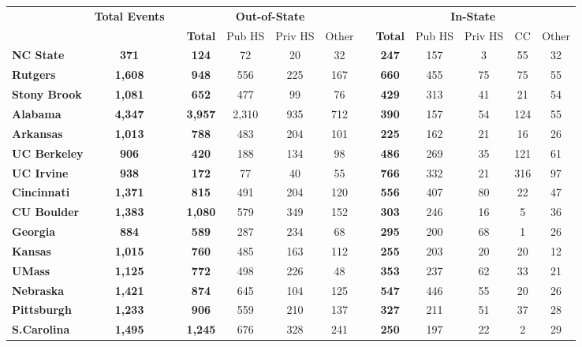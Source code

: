\begin{tabular*}{\textwidth}{@{\extracolsep{\fill} } lcccccccccccc}%
&\bfseries Total Events&&\multicolumn{4}{c}{\bfseries Out-of-State}&&\multicolumn{5}{c}{\bfseries In-State}\\%
&&&\bfseries Total&Pub HS&Priv HS&Other&&\bfseries Total&Pub HS&Priv HS&CC&Other\\%
\hline%
\bfseries NC State&\bfseries 371&&\bfseries 124&72&20&32&&\bfseries 247&157&3&55&32\\%
\bfseries Rutgers&\bfseries 1,608&&\bfseries 948&556&225&167&&\bfseries 660&455&75&75&55\\%
\bfseries Stony Brook&\bfseries 1,081&&\bfseries 652&477&99&76&&\bfseries 429&313&41&21&54\\%
\bfseries Alabama&\bfseries 4,347&&\bfseries 3,957&2,310&935&712&&\bfseries 390&157&54&124&55\\%
\bfseries Arkansas&\bfseries 1,013&&\bfseries 788&483&204&101&&\bfseries 225&162&21&16&26\\%
\bfseries UC Berkeley&\bfseries 906&&\bfseries 420&188&134&98&&\bfseries 486&269&35&121&61\\%
\bfseries UC Irvine&\bfseries 938&&\bfseries 172&77&40&55&&\bfseries 766&332&21&316&97\\%
\bfseries Cincinnati&\bfseries 1,371&&\bfseries 815&491&204&120&&\bfseries 556&407&80&22&47\\%
\bfseries CU Boulder&\bfseries 1,383&&\bfseries 1,080&579&349&152&&\bfseries 303&246&16&5&36\\%
\bfseries Georgia&\bfseries 884&&\bfseries 589&287&234&68&&\bfseries 295&200&68&1&26\\%
\bfseries Kansas&\bfseries 1,015&&\bfseries 760&485&163&112&&\bfseries 255&203&20&20&12\\%
\bfseries UMass&\bfseries 1,125&&\bfseries 772&498&226&48&&\bfseries 353&237&62&33&21\\%
\bfseries Nebraska&\bfseries 1,421&&\bfseries 874&645&104&125&&\bfseries 547&446&55&20&26\\%
\bfseries Pittsburgh&\bfseries 1,233&&\bfseries 906&559&210&137&&\bfseries 327&211&51&37&28\\%
\bfseries S.Carolina&\bfseries 1,495&&\bfseries 1,245&676&328&241&&\bfseries 250&197&22&2&29\\%
\hline%
\end{tabular*}
